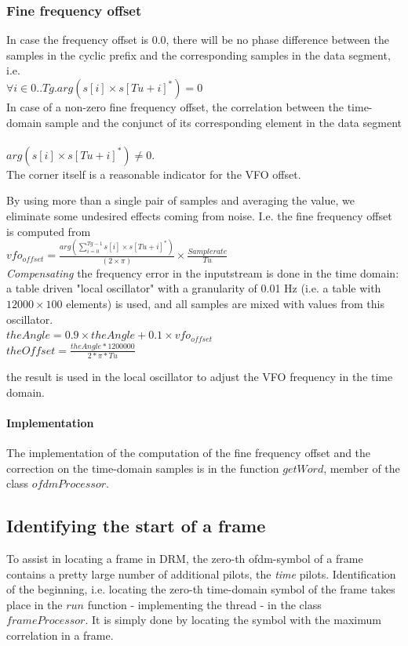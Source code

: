 \documentclass[11pt]{article}
\begin{document}
\subsubsection{Fine frequency offset}
In case the frequency offset is 0.0,
there will be no phase difference between
the samples in the cyclic prefix and the corresponding samples in the
data segment, i.e.
{
\ \\
$ \forall i \in 0 .. Tg.  arg (s [i] \times s [Tu + i]^*) = 0$
\ \\
}
In case of a non-zero fine frequency offset,
the correlation between the time-domain sample
and the conjunct of its corresponding element in the data segment
{
\ \\
$arg (s [i] \times s [Tu + i]^*) \neq 0$.
\ \\
}
The corner itself is a reasonable indicator
for the VFO offset.

By using more than a single pair of samples and averaging the value,
we eliminate some undesired effects
coming from noise. I.e. the fine frequency offset is computed from
{
\ \\
$vfo_{offset} = \frac {arg (\sum_{i=0}^{Tg - 1} s [i] \times s [Tu + i]^*)}{(2 \times \pi)} \times \frac{Samplerate}{Tu}$
\ \\
}
{\em Compensating} the frequency error in the inputstream is
done in the time domain:
a table driven "local oscillator" with a granularity of 0.01 Hz (i.e.
a table with $12000 \times 100$ elements) is used,
and all samples are mixed with values from this oscillator.
{
\ \\
$theAngle = 0.9 \times theAngle + 0.1 \times vfo_{offset}$
\ \\
$theOffset = \frac{theAngle * 1200000}{2 * \pi * Tu}$
\ \\
}

the result is used in the local oscillator to adjust the
VFO frequency in the
time domain.
\paragraph{Implementation}
The implementation of the  computation of the
fine frequency offset and the correction on the
time-domain samples is in the function $getWord$,
member of the class $ofdmProcessor$. 
\subsection{Identifying the start of a frame}
To assist in locating a frame in DRM, the zero-th ofdm-symbol of a frame
contains a pretty large number of additional pilots, the {\em time} pilots.
Identification of the beginning, i.e. locating
the zero-th time-domain symbol of the frame
takes place in the $run$ function - implementing the thread - in the class
$frameProcessor$. 
It is simply done by locating the
symbol with the maximum correlation in a frame.
\end{document}
